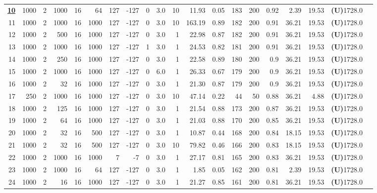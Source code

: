 \begin{table}
\begin{tabular}{@{}r r r r r r r r r r r r r r r r r r r r@{}}
    \textbf{\underline{10}} & 1000 & 2 & 1000 & 16 & 64 & 127 & -127 & 0 & 3.0 & 10 & 11.93 & 0.05 & 183 & 200 & 0.92 & 2.39 & 19.53 & \textbf{(U)}1728.0 \\
    11 & 1000 & 2 & 1000 & 16 & 1000 & 127 & -127 & 0 & 3.0 & 10 & 163.19 & 0.89 & 182 & 200 & 0.91 & 36.21 & 19.53 & \textbf{(U)}1728.0 \\
    12 & 1000 & 2 & 500 & 16 & 1000 & 127 & -127 & 0 & 3.0 & 1 & 22.98 & 0.87 & 182 & 200 & 0.91 & 36.21 & 19.53 & \textbf{(U)}1728.0 \\
    13 & 1000 & 2 & 1000 & 16 & 1000 & 127 & -127 & 1 & 3.0 & 1 & 24.53 & 0.82 & 181 & 200 & 0.91 & 36.21 & 19.53 & \textbf{(U)}1728.0 \\
    14 & 1000 & 2 & 250 & 16 & 1000 & 127 & -127 & 0 & 3.0 & 1 & 22.58 & 0.89 & 180 & 200 & 0.9 & 36.21 & 19.53 & \textbf{(U)}1728.0 \\
    15 & 1000 & 2 & 1000 & 16 & 1000 & 127 & -127 & 0 & 6.0 & 1 & 26.33 & 0.67 & 179 & 200 & 0.9 & 36.21 & 19.53 & \textbf{(U)}1728.0 \\
    16 & 1000 & 2 & 32 & 16 & 1000 & 127 & -127 & 0 & 3.0 & 1 & 21.30 & 0.87 & 179 & 200 & 0.9 & 36.21 & 19.53 & \textbf{(U)}1728.0 \\
    17 & 250 & 2 & 1000 & 16 & 1000 & 127 & -127 & 0 & 3.0 & 10 & 47.14 & 0.22 & 44 & 50 & 0.88 & 36.21 & 4.88 & \textbf{(U)}1728.0 \\
    18 & 1000 & 2 & 125 & 16 & 1000 & 127 & -127 & 0 & 3.0 & 1 & 21.54 & 0.88 & 173 & 200 & 0.87 & 36.21 & 19.53 & \textbf{(U)}1728.0 \\
    19 & 1000 & 2 & 64 & 16 & 1000 & 127 & -127 & 0 & 3.0 & 1 & 21.03 & 0.88 & 170 & 200 & 0.85 & 36.21 & 19.53 & \textbf{(U)}1728.0 \\
    20 & 1000 & 2 & 32 & 16 & 500 & 127 & -127 & 0 & 3.0 & 1 & 10.87 & 0.44 & 168 & 200 & 0.84 & 18.15 & 19.53 & \textbf{(U)}1728.0 \\
    21 & 1000 & 2 & 32 & 16 & 500 & 127 & -127 & 0 & 3.0 & 10 & 79.82 & 0.46 & 166 & 200 & 0.83 & 18.15 & 19.53 & \textbf{(U)}1728.0 \\
    22 & 1000 & 2 & 1000 & 16 & 1000 & 7 & -7 & 0 & 3.0 & 1 & 27.17 & 0.81 & 165 & 200 & 0.83 & 36.21 & 19.53 & \textbf{(U)}1728.0 \\
    23 & 1000 & 2 & 1000 & 16 & 64 & 127 & -127 & 0 & 3.0 & 1 & 1.85 & 0.05 & 162 & 200 & 0.81 & 2.39 & 19.53 & \textbf{(U)}1728.0 \\
    24 & 1000 & 2 & 16 & 16 & 1000 & 127 & -127 & 0 & 3.0 & 1 & 21.27 & 0.85 & 161 & 200 & 0.81 & 36.21 & 19.53 & \textbf{(U)}1728.0 \\

\end{tabular}
\end{table}
